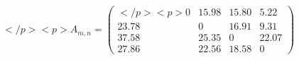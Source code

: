 \documentclass[12pt]{article}
\begin{document}
$ \begin{equation*}</p>
<p>A_{m,n} = \begin{pmatrix}</p>
<p>0 &15.98 & 15.80& 5.22\\ 23.78 & 0 &16.91 & 9.31 \\ 37.58 & 25.35 & 0 & 22.07 \\ 27.86 & 22.56 & 18.58 & 0\end{pmatrix}\end{equation*} $
\end{document}

